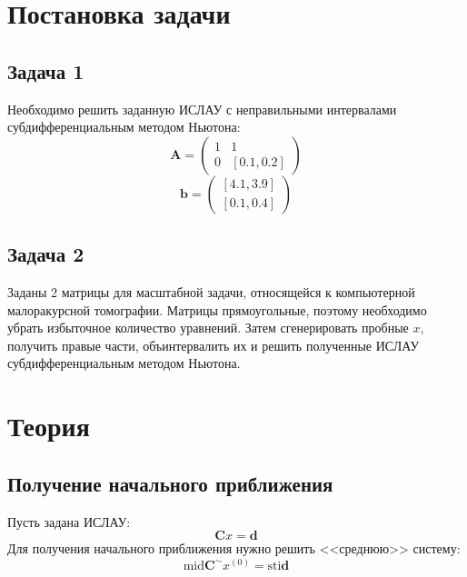 
\usepackage{amsmath}

\lstset{language=Java} 




\renewcommand\contentsname{\centerline{Содержание}}
\tableofcontents
\newpage

\listoffigures
\newpage


\section{Постановка задачи}
\subsection{Задача 1}
Необходимо решить заданную ИСЛАУ с неправильными интервалами субдифференциальным методом Ньютона:
\begin{equation}
	\textbf{A} =
	\begin{pmatrix}
		1 & 1 \\
		0 & [0.1, 0.2]
	\end{pmatrix}
\end{equation}
\begin{equation}
	\textbf{b} =
	\begin{pmatrix}
		[4.1, 3.9] \\
		[0.1, 0.4]
	\end{pmatrix}
\end{equation}

\subsection{Задача 2}
Заданы 2 матрицы для масштабной задачи, относящейся к компьютерной малоракурсной томографии. Матрицы прямоугольные, поэтому необходимо убрать избыточное количество уравнений. Затем сгенерировать пробные $x$, получить правые части, объинтервалить их и решить полученные ИСЛАУ субдифференциальным методом Ньютона.



\section{Теория}
\subsection{Получение начального приближения}
Пусть задана ИСЛАУ:
\begin{equation}
	\textbf{C} x = \textbf{d}
\end{equation}
Для получения начального приближения нужно решить <<среднюю>> систему:
\begin{equation}
	\text{mid} \textbf{C}^\sim x^{(0)} = \text{sti} \textbf{d}
\end{equation}


